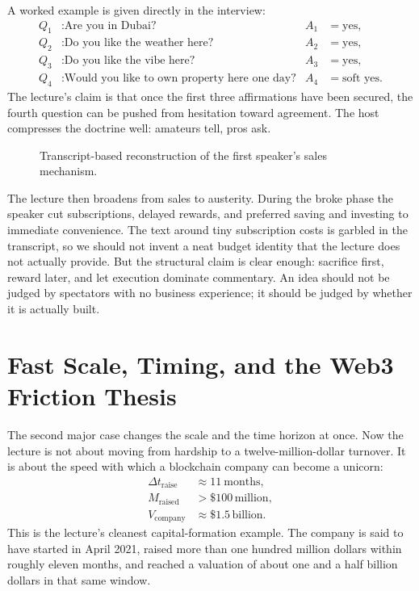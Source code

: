 A worked example is given directly in the interview:
\begin{align}
Q_1 &: \text{Are you in Dubai?} & A_1 &= \text{yes}, \\
Q_2 &: \text{Do you like the weather here?} & A_2 &= \text{yes}, \\
Q_3 &: \text{Do you like the vibe here?} & A_3 &= \text{yes}, \\
Q_4 &: \text{Would you like to own property here one day?} & A_4 &= \text{soft yes}.
\end{align}
The lecture's claim is that once the first three affirmations have been secured, the fourth question can be pushed from hesitation toward agreement. The host compresses the doctrine well: amateurs tell, pros ask.

\begin{figure}[h]
\centering
{}
\caption{Transcript-based reconstruction of the first speaker's sales mechanism.}
\end{figure}

The lecture then broadens from sales to austerity. During the broke phase the speaker cut subscriptions, delayed rewards, and preferred saving and investing to immediate convenience. The text around tiny subscription costs is garbled in the transcript, so we should not invent a neat budget identity that the lecture does not actually provide. But the structural claim is clear enough: sacrifice first, reward later, and let execution dominate commentary. An idea should not be judged by spectators with no business experience; it should be judged by whether it is actually built.

\section{Fast Scale, Timing, and the Web3 Friction Thesis}

The second major case changes the scale and the time horizon at once. Now the lecture is not about moving from hardship to a twelve-million-dollar turnover. It is about the speed with which a blockchain company can become a unicorn:
\begin{align}
\Delta t_{\text{raise}} &\approx 11\ \text{months}, \\
M_{\text{raised}} &> \$100\,\text{million}, \\
V_{\text{company}} &\approx \$1.5\,\text{billion}.
\end{align}
This is the lecture's cleanest capital-formation example. The company is said to have started in April 2021, raised more than one hundred million dollars within roughly eleven months, and reached a valuation of about one and a half billion dollars in that same window.

